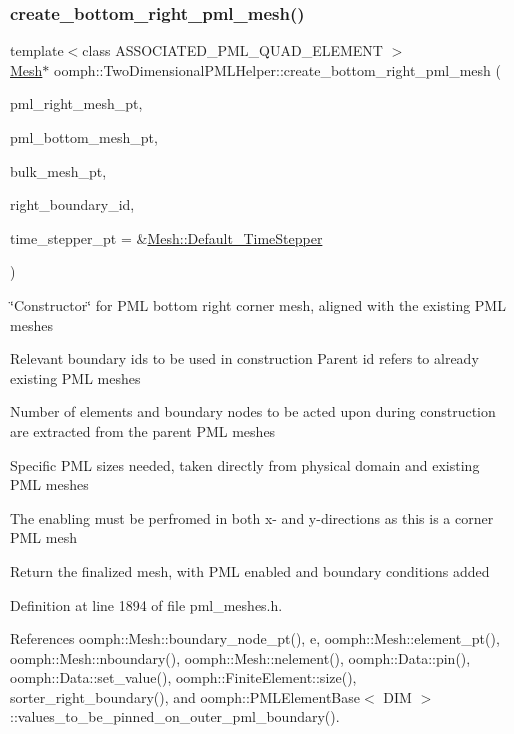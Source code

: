\subsubsection{\texorpdfstring{create\+\_\+bottom\+\_\+right\+\_\+pml\+\_\+mesh()}{create\_bottom\_right\_pml\_mesh()}}
{\footnotesize\ttfamily template$<$class A\+S\+S\+O\+C\+I\+A\+T\+E\+D\+\_\+\+P\+M\+L\+\_\+\+Q\+U\+A\+D\+\_\+\+E\+L\+E\+M\+E\+NT $>$ \\
\hyperlink{classoomph_1_1Mesh}{Mesh}$\ast$ oomph\+::\+Two\+Dimensional\+P\+M\+L\+Helper\+::create\+\_\+bottom\+\_\+right\+\_\+pml\+\_\+mesh (\begin{DoxyParamCaption}\item[{\hyperlink{classoomph_1_1Mesh}{Mesh} $\ast$}]{pml\+\_\+right\+\_\+mesh\+\_\+pt,  }\item[{\hyperlink{classoomph_1_1Mesh}{Mesh} $\ast$}]{pml\+\_\+bottom\+\_\+mesh\+\_\+pt,  }\item[{\hyperlink{classoomph_1_1Mesh}{Mesh} $\ast$}]{bulk\+\_\+mesh\+\_\+pt,  }\item[{const unsigned \&}]{right\+\_\+boundary\+\_\+id,  }\item[{\hyperlink{classoomph_1_1TimeStepper}{Time\+Stepper} $\ast$}]{time\+\_\+stepper\+\_\+pt = {\ttfamily \&\hyperlink{classoomph_1_1Mesh_a12243d0fee2b1fcee729ee5a4777ea10}{Mesh\+::\+Default\+\_\+\+Time\+Stepper}} }\end{DoxyParamCaption})}



\char`\"{}\+Constructor\char`\"{} for P\+ML bottom right corner mesh, aligned with the existing P\+ML meshes 

Relevant boundary id\textquotesingle{}s to be used in construction Parent id refers to already existing P\+ML meshes

Number of elements and boundary nodes to be acted upon during construction are extracted from the \textquotesingle{}parent\textquotesingle{} P\+ML meshes

Specific P\+ML sizes needed, taken directly from physical domain and existing P\+ML meshes

The enabling must be perfromed in both x-\/ and y-\/directions as this is a corner P\+ML mesh

Return the finalized mesh, with P\+ML enabled and boundary conditions added 

Definition at line 1894 of file pml\+\_\+meshes.\+h.



References oomph\+::\+Mesh\+::boundary\+\_\+node\+\_\+pt(), e, oomph\+::\+Mesh\+::element\+\_\+pt(), oomph\+::\+Mesh\+::nboundary(), oomph\+::\+Mesh\+::nelement(), oomph\+::\+Data\+::pin(), oomph\+::\+Data\+::set\+\_\+value(), oomph\+::\+Finite\+Element\+::size(), sorter\+\_\+right\+\_\+boundary(), and oomph\+::\+P\+M\+L\+Element\+Base$<$ D\+I\+M $>$\+::values\+\_\+to\+\_\+be\+\_\+pinned\+\_\+on\+\_\+outer\+\_\+pml\+\_\+boundary().

